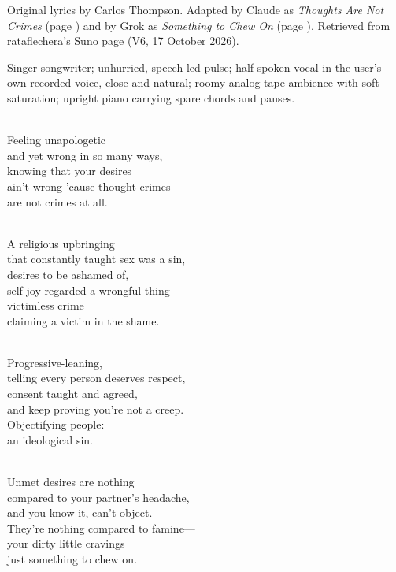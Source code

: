 
\label{sec:victless-crime}
\begin{notes}
Original lyrics by Carlos Thompson. Adapted by Claude as \emph{Thoughts Are Not Crimes} (page \pageref{sec:thoughts-are-not-crimes}) and by Grok as \emph{Something to Chew On} (page \pageref{sec:something-to-chew-on}). Retrieved from rataflechera's Suno page (V6, 17 October 2026).
\end{notes}
\begin{style}
Singer-songwriter; unhurried, speech-led pulse; half-spoken vocal in the user's own recorded voice, close and natural; roomy analog tape ambience with soft saturation; upright piano carrying spare chords and pauses.
\end{style}
\begin{lyrics}
\\
Feeling unapologetic\\
and yet wrong in so many ways,\\
knowing that your desires\\
ain't wrong 'cause thought crimes\\
are not crimes at all.

\\
A religious upbringing\\
that constantly taught sex was a sin,\\
desires to be ashamed of,\\
self-joy regarded a wrongful thing—\\
victimless crime\\
claiming a victim in the shame.

\\
Progressive-leaning,\\
telling every person deserves respect,\\
consent taught and agreed,\\
and keep proving you're not a creep.\\
Objectifying people:\\
an ideological sin.

\\
Unmet desires are nothing\\
compared to your partner's headache,\\
and you know it, can't object.\\
They're nothing compared to famine—\\
your dirty little cravings\\
just something to chew on.
\end{lyrics}

